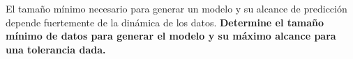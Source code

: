 \documentclass[spanish,notitlepage,letterpaper,12pt]{article} %
\begin{document}
El tamaño mínimo necesario para generar un modelo y su alcance de predicción depende fuertemente de la dinámica de los datos. \textbf{Determine el tamaño mínimo de datos para generar el modelo y su máximo alcance para una tolerancia dada.}



\end{document}
